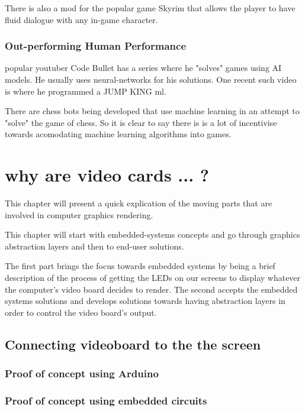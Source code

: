                 There is also a mod for the popular game Skyrim that allows the player to have fluid dialogue with any in-game character. 
        
        \subsection{Out-performing Human Performance}
            popular youtuber Code Bullet has a series where he "solves" games using AI models. He usually uses neural-networks for his solutions. One recent such video is where he programmed a JUMP KING ml.
            
            There are chess bots being developed that use machine learning in an attempt to "solve" the game of chess. So it is clear to say there is is a lot of incentivise towards acomodating machine learning algorithms into games.




\chapter{why are video cards ... ?}

    This chapter will present a quick explication of the moving parts that are involved in computer graphics rendering.

    This chapter will start with embedded-systems concepts and go through graphics abstraction layers and then to end-user solutions. 

    The first part brings the focus towards embedded systems by being a brief description of the process of getting the LEDs on our screens to display whatever the computer's video board decides to render. 
    The second accepts the embedded systems solutions and develops solutions towards having abstraction layers in order to control the video board's output.

    \section{Connecting videoboard to the the screen}

        \subsection{Proof of concept using Arduino}

        \subsection{Proof of concept using embedded circuits}

